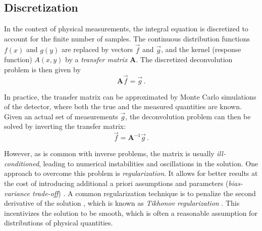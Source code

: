 \subsection{Discretization} \label{sec:dsea:deconvolution_problem:discretization}
In the context of physical measurements,
the integral equation is discretized
  to account for the finite number of samples.
The continuous distribution functions $f(x)$ and $g(y)$ are replaced by vectors $\vec{f}$ and $\vec{g}$,
and the kernel (response function) $A(x, y)$ by a \emph{transfer matrix} $\symbf{A}$.
%
The discretized deconvolution problem is then given by
\begin{equation}
  \label{eq:deconvolution_problem:discretized}
  \symbf{A} \vec{f} = \vec{g} \, .
\end{equation}

In practice,
the transfer matrix can be approximated
by Monte Carlo simulations of the detector,
  where both the true and the measured quantities are known.
Given an actual set of measurements $\vec{g}$,
the deconvolution problem can then be solved
by inverting the transfer matrix:
\begin{equation}
  \label{eq:deconvolution_problem:discretized:inverse}
  \vec{f} = \symbf{A}^{-1} \vec{g} \, .
\end{equation}

However,
as is common with inverse problems,
the matrix is usually \emph{ill-conditioned},
  leading to numerical instabilities
  and oscillations in the solution.
%
 \label{sec:dsea:deconvolution_problem:regularization}
One approach to overcome this problem
is \emph{regularization}.
It allows for better results
  at the cost of introducing additional a priori assumptions and parameters
    (\emph{bias-variance trade-off}) \cite{bias_variance_tradeoff}. %
%
A common regularization technique is
  to penalize the second derivative of the solution \cite{deconvolution_starck},
    which is known as \emph{Tikhonov regularization} \cite{tikhonov_regularization}.
This incentivizes the solution to be smooth,
  which is often a reasonable assumption for distributions of physical quantities.

